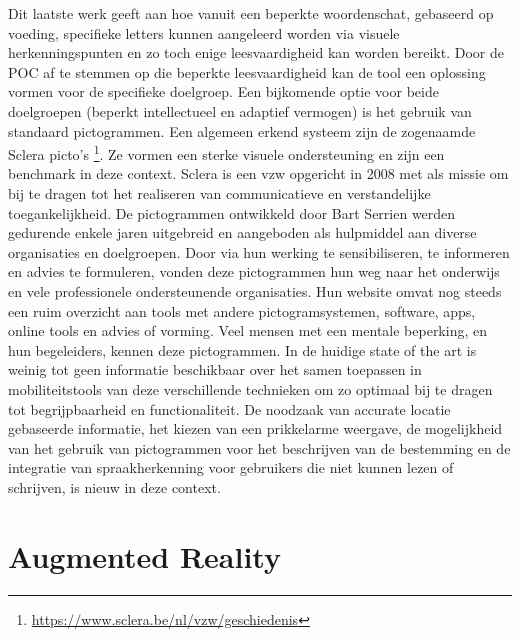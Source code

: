 Dit laatste werk geeft aan hoe vanuit een beperkte woordenschat, gebaseerd op voeding, specifieke letters kunnen aangeleerd worden via visuele herkenningspunten en zo toch enige leesvaardigheid kan worden bereikt. Door de POC af te stemmen op die beperkte leesvaardigheid kan de tool een oplossing vormen voor de specifieke doelgroep. Een bijkomende optie voor beide doelgroepen (beperkt intellectueel en adaptief vermogen) is het gebruik van standaard pictogrammen. Een algemeen erkend systeem zijn de zogenaamde Sclera picto’s \footnote{\url{https://www.sclera.be/nl/vzw/geschiedenis}}. Ze vormen een sterke visuele ondersteuning en zijn een benchmark in deze context. Sclera is een vzw opgericht in 2008 met als missie om bij te dragen tot het realiseren van communicatieve en verstandelijke toegankelijkheid. De pictogrammen ontwikkeld door Bart Serrien werden gedurende enkele jaren uitgebreid en aangeboden als hulpmiddel aan diverse organisaties en doelgroepen. Door via hun werking te sensibiliseren, te informeren en advies te formuleren, vonden deze pictogrammen hun weg naar het onderwijs en vele professionele ondersteunende organisaties. Hun website omvat nog steeds een ruim overzicht aan tools met andere pictogramsystemen, software, apps, online tools en advies of vorming. Veel mensen met een mentale beperking, en hun begeleiders, kennen deze pictogrammen. In de huidige state of the art is weinig tot geen informatie beschikbaar over het samen toepassen in mobiliteitstools van deze verschillende technieken om zo optimaal bij te dragen tot begrijpbaarheid en functionaliteit. De noodzaak van accurate locatie gebaseerde informatie, het kiezen van een prikkelarme weergave, de mogelijkheid van het gebruik van pictogrammen voor het beschrijven van de bestemming en de integratie van spraakherkenning voor gebruikers die niet kunnen lezen of schrijven, is nieuw in deze context.


\section{Augmented Reality}
\label{sec:augmented-reality}

